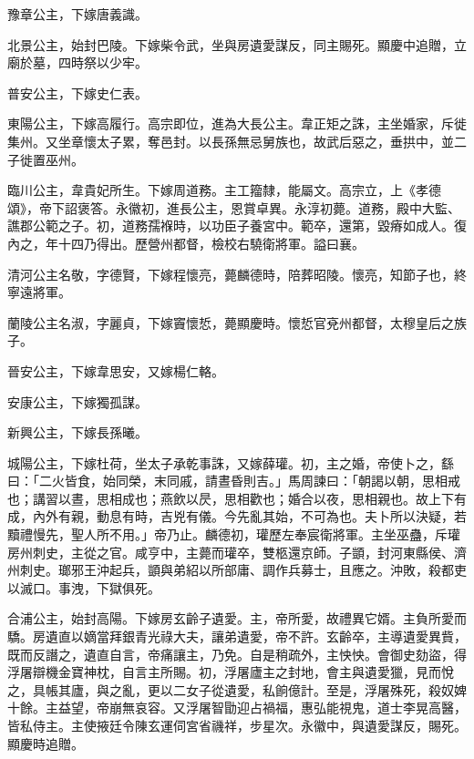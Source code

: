 \begin{pinyinscope}
 豫章公主，下嫁唐義識。



 北景公主，始封巴陵。下嫁柴令武，坐與房遺愛謀反，同主賜死。顯慶中追贈，立廟於墓，四時祭以少牢。



 普安公主，下嫁史仁表。



 東陽公主，下嫁高履行。高宗即位，進為大長公主。韋正矩之誅，主坐婚家，斥徙集州。又坐章懷太子累，奪邑封。以長孫無忌舅族也，故武后惡之，垂拱中，並二子徙置巫州。



 臨川公主，韋貴妃所生。下嫁周道務。主工籀隸，能屬文。高宗立，上《孝德頌》，帝下詔褒答。永徽初，進長公主，恩賞卓異。永淳初薨。道務，殿中大監、譙郡公範之子。初，道務孺褓時，以功臣子養宮中。範卒，還第，毀瘠如成人。復內之，年十四乃得出。歷營州都督，檢校右驍衛將軍。謚曰襄。



 清河公主名敬，字德賢，下嫁程懷亮，薨麟德時，陪葬昭陵。懷亮，知節子也，終寧遠將軍。



 蘭陵公主名淑，字麗貞，下嫁竇懷悊，薨顯慶時。懷悊官兗州都督，太穆皇后之族子。



 晉安公主，下嫁韋思安，又嫁楊仁輅。



 安康公主，下嫁獨孤謀。



 新興公主，下嫁長孫曦。



 城陽公主，下嫁杜荷，坐太子承乾事誅，又嫁薛瓘。初，主之婚，帝使卜之，繇曰：「二火皆食，始同榮，末同戚，請晝昏則吉。」馬周諫曰：「朝謁以朝，思相戒也；講習以晝，思相成也；燕飲以昃，思相歡也；婚合以夜，思相親也。故上下有成，內外有親，動息有時，吉兇有儀。今先亂其始，不可為也。夫卜所以決疑，若黷禮慢先，聖人所不用。」帝乃止。麟德初，瓘歷左奉宸衛將軍。主坐巫蠱，斥瓘房州刺史，主從之官。咸亨中，主薨而瓘卒，雙柩還京師。子顗，封河東縣侯、濟州刺史。瑯邪王沖起兵，顗與弟紹以所部庸、調作兵募士，且應之。沖敗，殺都吏以滅口。事洩，下獄俱死。



 合浦公主，始封高陽。下嫁房玄齡子遺愛。主，帝所愛，故禮異它婿。主負所愛而驕。房遺直以嫡當拜銀青光祿大夫，讓弟遺愛，帝不許。玄齡卒，主導遺愛異貲，既而反譖之，遺直自言，帝痛讓主，乃免。自是稍疏外，主怏怏。會御史劾盜，得浮屠辯機金寶神枕，自言主所賜。初，浮屠廬主之封地，會主與遺愛獵，見而悅之，具帳其廬，與之亂，更以二女子從遺愛，私餉億計。至是，浮屠殊死，殺奴婢十餘。主益望，帝崩無哀容。又浮屠智勖迎占禍福，惠弘能視鬼，道士李晃高醫，皆私侍主。主使掖廷令陳玄運伺宮省禨祥，步星次。永徽中，與遺愛謀反，賜死。顯慶時追贈。




\end{pinyinscope}
